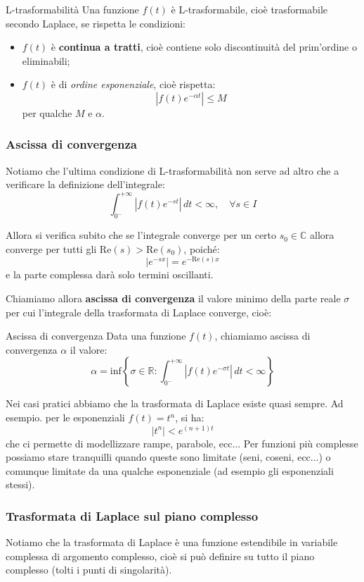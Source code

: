 \documentclass[a4paper,11pt]{article}
\begin{document}
\begin{definition}{L-trasformabilità}
	Una funzione $f(t)$ è L-trasformabile, cioè trasformabile secondo Laplace, se rispetta le condizioni:
\begin{itemize}
	\item $f(t)$ è \textbf{continua a tratti}, cioè contiene solo discontinuità del prim'ordine o eliminabili;
	\item $f(t)$ è di \textit{ordine esponenziale}, cioè rispetta:
$$
|f(t)e^{-\alpha t}| \leq M
$$
per qualche $M$ e $\alpha$.
\end{itemize}
\end{definition}

\subsubsection{Ascissa di convergenza}
Notiamo che l'ultima condizione di L-trasformabilità non serve ad altro che a verificare la definizione dell'integrale:
$$
\int_{0^-}^{+\infty} |f(t)e^{-st}| \, dt < \infty, \quad \forall s \in I
$$

Allora si verifica subito che se l'integrale converge per un certo $s_0 \in \mathbb{C}$ allora converge per tutti gli $\mathrm{Re}(s) > \mathrm{Re}(s_0)$, poiché:
$$
|e^{-sx}| = e^{-\mathrm{Re}(s) x}
$$
e la parte complessa darà solo termini oscillanti.

Chiamiamo allora \textbf{ascissa di convergenza} il valore minimo della parte reale $\sigma$ per cui l'integrale della trasformata di Laplace converge, cioè:
\begin{definition}{Ascissa di convergenza}
	Data una funzione $f(t)$, chiamiamo ascissa di convergenza $\alpha$ il valore:
	$$
		\alpha = \mathrm{inf} \left\{ \sigma \in \mathbb{R} : \int_{0^-}^{+\infty} |f(t)e^{-\sigma t}| \, dt < \infty \right\}
	$$
\end{definition}

\par\smallskip

Nei casi pratici abbiamo che la trasformata di Laplace esiste quasi sempre.
Ad esempio. per le esponenziali $f(t) = t^n$, si ha:
$$
|t^n| < e^{(n + 1)t}
$$
che ci permette di modellizzare rampe, parabole, ecc...
Per funzioni più complesse possiamo stare tranquilli quando queste sono limitate (seni, coseni, ecc...) o comunque limitate da una qualche esponenziale (ad esempio gli esponenziali stessi).

\subsubsection{Trasformata di Laplace sul piano complesso}
Notiamo che la trasformata di Laplace è una funzione estendibile in variabile complessa di argomento complesso, cioè si può definire su tutto il piano complesso (tolti i punti di singolarità).
\end{document}
